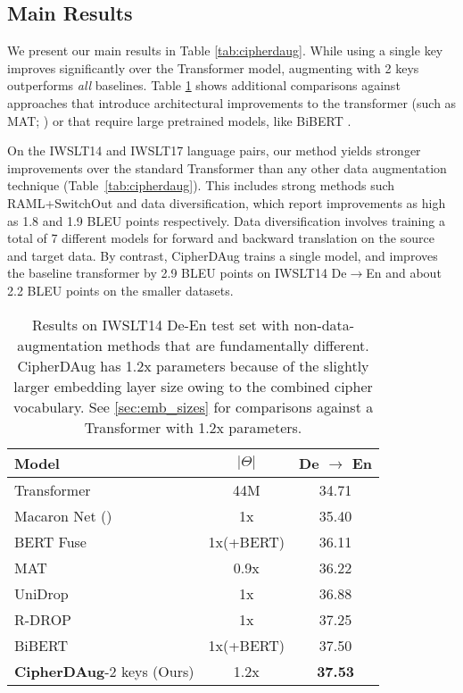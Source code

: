 \documentclass[11pt]{article}
\begin{document}
\subsection{Main Results}
We present our main results in Table \ref{tab:cipherdaug}. While using a single key improves significantly over the Transformer model, augmenting with 2 keys outperforms \textit{all} baselines. Table \ref{tab:cipher-vs-others} shows additional comparisons against approaches that introduce architectural improvements to the transformer (such as MAT; \citealt{fan2020multibranch}) or that require large pretrained models, like BiBERT \cite{xu2021bert}. 


On the IWSLT14 and IWSLT17 language pairs, our method yields stronger improvements over the standard Transformer than any other data augmentation technique (Table~\ref{tab:cipherdaug}). This includes strong methods such RAML+SwitchOut and data diversification, which report improvements as high as 1.8 and 1.9 BLEU points respectively. Data diversification involves training a total of 7 different models for forward and backward translation on the source and target data. By contrast, CipherDAug trains a single model, and improves the baseline transformer by 2.9 BLEU points on IWSLT14 De$\rightarrow$En and about 2.2 BLEU points on the smaller datasets. 



\begin{table}[!ht]
\small
\centering
\begin{tabular}{lcc}
\toprule
 \textbf{Model} & $|\Theta|$ &\textbf{De $\rightarrow$ En} \\ \midrule
 Transformer & 44M & 34.71 \\
 Macaron Net  (\citeyear{lu*2020understanding}) & 1x & 35.40 \\
 BERT Fuse \cite{Zhu2020Incorporating} & 1x(+BERT) & 36.11 \\
 MAT \cite{fan2020multibranch} & 0.9x & 36.22 \\ 
 UniDrop \cite{wu-etal-2021-unidrop} & 1x & 36.88 \\
 R-DROP \cite{liang2021rdrop} & 1x & 37.25 \\
 BiBERT \cite{xu2021bert} & 1x(+BERT) & 37.50 \\

 \midrule
 \textbf{CipherDAug}-2 keys (Ours) & 1.2x & \textbf{37.53} \\
 \bottomrule
\end{tabular}
\caption{Results on IWSLT14 De-En test set with non-data-augmentation methods that are fundamentally different. 
CipherDAug has 1.2x parameters because of the slightly larger embedding layer size owing to the combined cipher vocabulary. See \ref{sec:emb_sizes} for comparisons against a Transformer with 1.2x parameters.}
\label{tab:cipher-vs-others}
\end{table}
\end{document}
